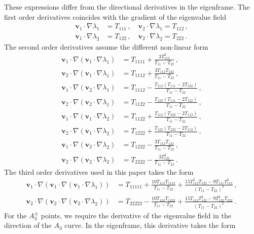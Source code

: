 \documentclass[a4paper, 11pt]{article}
\begin{document}
These expressions differ from the directional derivatives in the eigenframe. The first order derivatives coincides with the gradient of the eigenvalue field
\begin{align}
\bm{v}_1 \cdot \nabla \lambda_1 &= T_{111}\,,\quad
\bm{v}_2 \cdot \nabla \lambda_1 = T_{112}\,,\\
\bm{v}_1 \cdot \nabla \lambda_2 &= T_{122}\,,\quad
\bm{v}_2 \cdot \nabla \lambda_2 = T_{222}\,.
\end{align}
The second order derivatives assume the different non-linear form
\begin{align}
\bm{v}_1 \cdot \nabla (\bm{v}_1 \cdot \nabla \lambda_1) &= T_{1111} + \frac{3T_{112}^2}{T_{11}-T_{22}}\,,\\
\bm{v}_2 \cdot \nabla (\bm{v}_1 \cdot \nabla \lambda_1) &= T_{1112} + \frac{3T_{112}T_{122}}{T_{11}-T_{22}}\,,\\
\bm{v}_1 \cdot \nabla (\bm{v}_2 \cdot \nabla \lambda_1) &= T_{1112} - \frac{T_{112}(T_{111}-2T_{122})}{T_{11}-T_{22}}\,,\\
\bm{v}_2 \cdot \nabla (\bm{v}_2 \cdot \nabla \lambda_1) &= T_{1122} - \frac{T_{122}(T_{111}-2T_{122})}{T_{11}-T_{22}}\,,\\
\bm{v}_1 \cdot \nabla (\bm{v}_1 \cdot \nabla \lambda_2) &= T_{1122} + \frac{T_{112}(T_{222}-2T_{112})}{T_{11}-T_{22}}\,,\\
\bm{v}_2 \cdot \nabla (\bm{v}_1 \cdot \nabla \lambda_2) &= T_{1222} + \frac{T_{122}(T_{222}-2T_{112})}{T_{11}-T_{22}}\,,\\
\bm{v}_1 \cdot \nabla (\bm{v}_2 \cdot \nabla \lambda_2) &= T_{1222} - \frac{3T_{112}T_{122}}{T_{11}-T_{22}}\,,\\
\bm{v}_2 \cdot \nabla (\bm{v}_2 \cdot \nabla \lambda_2) &= T_{2222} - \frac{3T_{122}^2}{T_{11}-T_{22}}\,.
\end{align}
The third order derivatives used in this paper takes the form
\begin{align}
\bm{v}_1\cdot \nabla(\bm{v}_1 \cdot \nabla (\bm{v}_1 \cdot \nabla \lambda_1)) &=
T_{11111}+
\frac{10T_{112}T_{1112}}{T_{11}-T_{22}}+
\frac{15 T_{112}^2T_{122}-9T_{111}T_{112}^2}{(T_{11}-T_{22})^2}\,,\\
\bm{v}_2\cdot \nabla(\bm{v}_2 \cdot \nabla (\bm{v}_2 \cdot \nabla \lambda_2)) &=
T_{22222} -\frac{10T_{122}T_{1222}}{T_{11}-T_{22}}
+ \frac{15T_{112}T_{122}^2-9T_{122}^2T_{222}}{(T_{11}-T_{22})^2}\,.
\end{align}
For the $A_3^\pm$ points, we require the derivative of the eigenvalue field in the direction of the $A_3$ curve. In the eigenframe, this derivative takes the form
\end{document}
